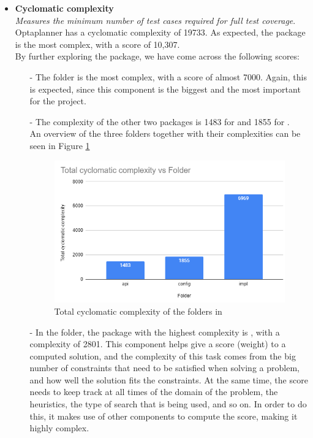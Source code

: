             \begin{itemize}
                \item \textbf{Cyclomatic complexity} \\
                \textit{Measures the minimum number of test cases required for full test coverage}.\\ Optaplanner has a cyclomatic complexity of 19733. As expected, the  package is the most complex, with a score of 10,307.\\
                By further exploring the package, we have come across the following scores:
                \begin{itemize}
                    \item[-] The  folder is the most complex, with a score of almost 7000. Again, this is expected, since this component is the biggest and the most important for the project. 
                    \item[-] The complexity of the other two packages is 1483 for  and 1855 for .\\
                    An overview of the three folders together with their complexities can be seen in Figure \ref{fig:corecyclomatic}
                    \begin{figure}[H]
                        \centering
                        \includegraphics{figures/step3/cyclomaticcomplexitycore.PNG}
                        \caption{Total cyclomatic complexity of the folders in }
                        \label{fig:corecyclomatic}
                    \end{figure}
                    \item[-] In the  folder, the package with the highest complexity is , with a complexity of 2801. This component helps give a score (weight) to a computed solution, and the complexity of this task comes from the big number of constraints that need to be satisfied when solving a problem, and how well the solution fits the constraints. At the same time, the score needs to keep track at all times of the domain of the problem, the heuristics, the type of search that is being used, and so on. In order to do this, it makes use of other components to compute the score, making it highly complex.

\end{itemize}
\end{itemize}
